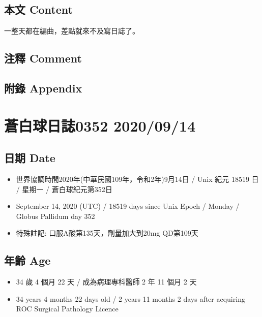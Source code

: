 \documentclass[
]{article}
\providecommand{\tightlist}{%
  \setlength{\itemsep}{0pt}\setlength{\parskip}{0pt}}
\begin{document}
\hypertarget{ux672cux6587-content-12}{%
\subsection{本文 Content}\label{ux672cux6587-content-12}}

一整天都在編曲，差點就來不及寫日誌了。

\hypertarget{ux6ce8ux91cb-comment-12}{%
\subsection{注釋 Comment}\label{ux6ce8ux91cb-comment-12}}

\hypertarget{ux9644ux9304-appendix-12}{%
\subsection{附錄 Appendix}\label{ux9644ux9304-appendix-12}}

\hypertarget{ux84bcux767dux7403ux65e5ux8a8c0352-20200914}{%
\section{蒼白球日誌0352
2020/09/14}\label{ux84bcux767dux7403ux65e5ux8a8c0352-20200914}}

\hypertarget{ux65e5ux671f-date-13}{%
\subsection{日期 Date}\label{ux65e5ux671f-date-13}}

\begin{itemize}
\tightlist
\item
  世界協調時間2020年(中華民國109年，令和2年)9月14日 / Unix 紀元 18519 日
  / 星期一 / 蒼白球紀元第352日
\item
  September 14, 2020 (UTC) / 18519 days since Unix Epoch / Monday /
  Globus Pallidum day 352
\item
  特殊註記: 口服A酸第135天，劑量加大到20mg QD第109天
\end{itemize}

\hypertarget{ux5e74ux9f61-age-13}{%
\subsection{年齡 Age}\label{ux5e74ux9f61-age-13}}

\begin{itemize}
\tightlist
\item
  34 歲 4 個月 22 天 / 成為病理專科醫師 2 年 11 個月 2 天
\item
  34 years 4 months 22 days old / 2 years 11 months 2 days after
  acquiring ROC Surgical Pathology Licence
\end{itemize}
\end{document}
